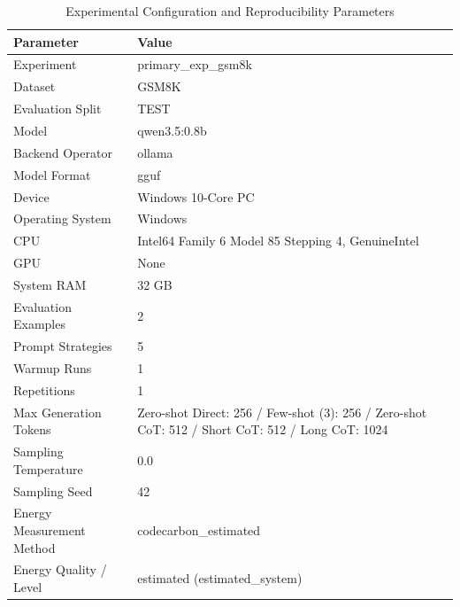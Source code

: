 \begin{table}
\caption{Experimental Configuration and Reproducibility Parameters}
\label{tab:experimental_configuration}
\begin{tabular}{ll}
\toprule
Parameter & Value \\
\midrule
Experiment & primary\_exp\_gsm8k \\
Dataset & GSM8K \\
Evaluation Split & TEST \\
Model & qwen3.5:0.8b \\
Backend Operator & ollama \\
Model Format & gguf \\
Device & Windows 10-Core PC \\
Operating System & Windows \\
CPU & Intel64 Family 6 Model 85 Stepping 4, GenuineIntel \\
GPU & None \\
System RAM & 32 GB \\
Evaluation Examples & 2 \\
Prompt Strategies & 5 \\
Warmup Runs & 1 \\
Repetitions & 1 \\
Max Generation Tokens & Zero-shot Direct: 256 / Few-shot (3): 256 / Zero-shot CoT: 512 / Short CoT: 512 / Long CoT: 1024 \\
Sampling Temperature & 0.0 \\
Sampling Seed & 42 \\
Energy Measurement Method & codecarbon\_estimated \\
Energy Quality / Level & estimated (estimated\_system) \\
\bottomrule
\end{tabular}
\end{table}
